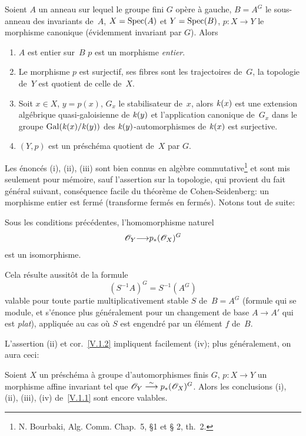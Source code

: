 \begin{proposition}
\label{V.1.1}
Soient $A$ un anneau sur lequel le groupe fini $G$ op\`ere \`a
gauche, $B=A^G$ le sous-anneau des invariants de~$A$, $X=\operatorname{Spec}(A)$ et
$Y=\operatorname{Spec}(B)$, $p\colon X\to Y$ le morphisme canonique (\'evidemment
invariant par $G$). Alors
\begin{enumerate}
\item[(i)] $A$ est entier sur~$B$ \ie $p$ est un morphisme
\emph{entier}.
\item[(ii)] Le morphisme $p$ est surjectif, ses fibres sont les
trajectoires de~$G$, la topologie de~$Y$ est quotient de celle de~$X$.
\item[(iii)] Soit $x\in X$, $y=p(x)$, $G_x$ le stabilisateur de~$x$, alors
$\mathit{k}(x)$ est une extension alg\'ebrique quasi-galoisienne de
$\mathit{k}(y)$ et l'application canonique de~$G_x$ dans le groupe
$\operatorname{Gal}(\mathit{k}(x)/\mathit{k}(y))$ des $\mathit{k}(y)$-automorphismes de
$\mathit{k}(x)$
est
surjective.
\item[(iv)] $(Y,p)$ est un pr\'esch\'ema quotient de~$X$ par $G$.
\end{enumerate}
\end{proposition}

Les \'enonc\'es
(i), (ii), (iii)
sont bien connus en alg\`ebre
commutative\footnote{\Cf N. Bourbaki, Alg. Comm. Chap.\, 5, \S 1 et \S
2, th.\, 2.} et sont mis seulement pour m\'emoire, sauf l'assertion
sur la topologie, qui provient du fait g\'en\'eral suivant,
cons\'equence facile du th\'eor\`eme de Cohen-Seidenberg: un
morphisme entier est ferm\'e (\ie transforme ferm\'es en
ferm\'es). Notons tout de suite:

\begin{corollaire}
\label{V.1.2}
Sous les conditions pr\'ec\'edentes, l'homomorphisme naturel
$$\cal{O}_Y{\to} p_*(\cal{O}_X)^G$$ est un isomorphisme.
\end{corollaire}

Cela r\'esulte aussit\^ot de la formule
$$
(S^{-1}A)^G = S^{-1}(A^G)
$$
valable pour toute partie multiplicativement stable $S$ de~$B=A^G$
(formule qui se module, et s'\'enonce plus g\'en\'eralement pour
un changement de base $A\to A'$ qui est \emph{plat}),
appliqu\'ee
au cas o\`u $S$ est engendr\'e par un \'el\'ement $f$ de~$B$.

L'assertion (ii) et cor.\, \ref{V.1.2} impliquent facilement (iv); plus
g\'en\'eralement, on aura ceci:

\begin{proposition}
\label{V.1.3}
Soient
$X$ un pr\'esch\'ema \`a groupe d'automorphismes finis
$G$, $p\colon{}X\to{}Y$ un morphisme affine invariant tel que
$\cal{O}_Y\isomto p_*(\cal{O}_X)^G$. Alors les conclusions
\textup{(i), (ii), (iii), (iv)}
de~\ref{V.1.1} sont encore valables.
\end{proposition}

